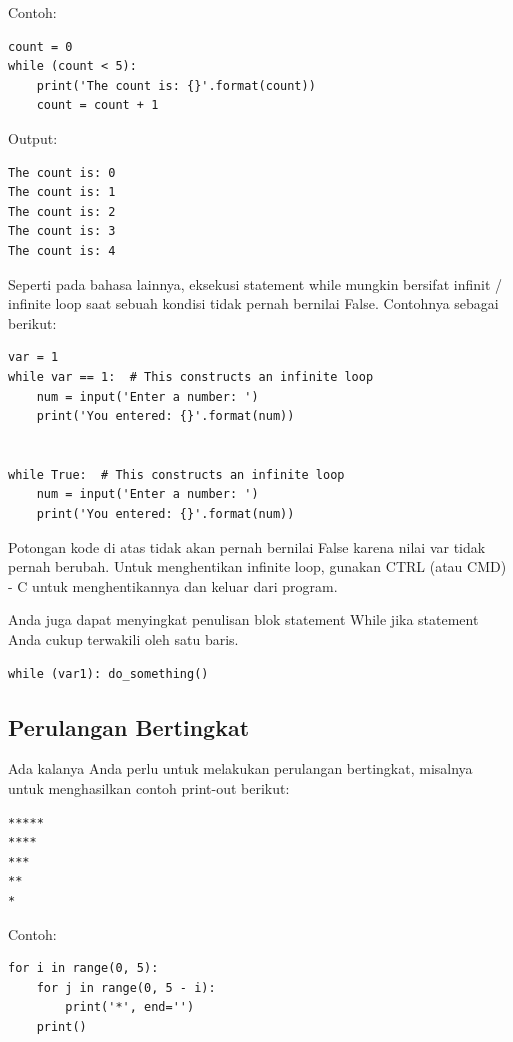Contoh:
\begin{verbatim}
count = 0
while (count < 5):
    print('The count is: {}'.format(count))
    count = count + 1
\end{verbatim}
Output:
\begin{verbatim}
The count is: 0
The count is: 1
The count is: 2
The count is: 3
The count is: 4
\end{verbatim}
Seperti pada bahasa lainnya, eksekusi statement while mungkin bersifat infinit / infinite loop saat sebuah kondisi tidak pernah bernilai False. Contohnya sebagai berikut:
\begin{verbatim}
var = 1
while var == 1:  # This constructs an infinite loop
    num = input('Enter a number: ')
    print('You entered: {}'.format(num))
 
 
while True:  # This constructs an infinite loop
    num = input('Enter a number: ')
    print('You entered: {}'.format(num))
\end{verbatim}
Potongan kode di atas tidak akan pernah bernilai False karena nilai var tidak pernah berubah. Untuk menghentikan infinite loop, gunakan CTRL (atau CMD) - C untuk menghentikannya dan keluar dari program.

Anda juga dapat menyingkat penulisan blok statement While jika statement Anda cukup terwakili oleh satu baris.
\begin{verbatim}
while (var1): do_something()
\end{verbatim}

\subsection{Perulangan Bertingkat}
Ada kalanya Anda perlu untuk melakukan perulangan bertingkat, misalnya untuk menghasilkan contoh print-out berikut:

\begin{verbatim}
*****
****
***
**
*
\end{verbatim}

Contoh:
\begin{verbatim}
for i in range(0, 5):
    for j in range(0, 5 - i):
        print('*', end='')
    print()
\end{verbatim}

